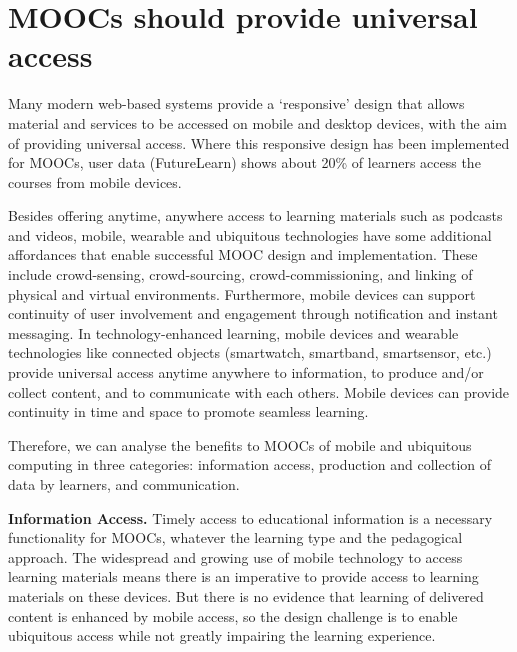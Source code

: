 \section{MOOCs should provide universal access}



Many modern web-based systems provide a `responsive' design that allows
material and services to be accessed on mobile and desktop devices, with
the aim of providing universal access. Where this responsive design has
been implemented for MOOCs, user data (FutureLearn) shows about 20\% of
learners access the courses from mobile devices.

Besides offering anytime, anywhere access to learning materials such as
podcasts and videos, mobile, wearable and ubiquitous technologies have
some additional affordances that enable successful MOOC design and
implementation. These include crowd-sensing, crowd-sourcing,
crowd-commissioning, and linking of physical and virtual
environments. Furthermore, mobile devices can support continuity of user
involvement and engagement through notification and instant
messaging. In technology-enhanced learning, mobile devices and wearable
technologies like connected objects (smartwatch, smartband, smartsensor,
etc.) provide universal access anytime anywhere to information, to
produce and/or collect content, and to communicate with each
others. Mobile devices can provide continuity in time and space to
promote seamless learning.

Therefore, we can analyse the benefits to MOOCs of mobile and ubiquitous
computing in three categories: information access, production and
collection of data by learners, and communication.

\textbf{Information Access.}  Timely access to educational information is a
necessary functionality for MOOCs, whatever the learning type and the
pedagogical approach. The widespread and growing use of mobile
technology to access learning materials means there is an imperative to
provide access to learning materials on these devices. But there is no
evidence that learning of delivered content is enhanced by mobile
access, so the design challenge is to enable ubiquitous access while not
greatly impairing the learning experience.  


